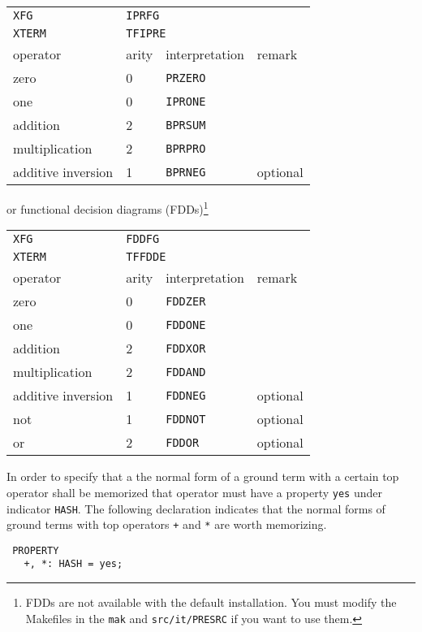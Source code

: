 \begin{description}
\begin{tabular}[t]{l|l|l|l}
\hline
\texttt{XFG} & \multicolumn{3}{l}{\texttt{IPRFG}} \\
\texttt{XTERM} & \multicolumn{3}{l}{\texttt{TFIPRE}} \\
\hline
\hline
operator & arity & interpretation & remark \\
\hline
zero & 0 & \texttt{PRZERO} \\
one & 0 & \texttt{IPRONE} \\
addition & 2 & \texttt{BPRSUM} \\
multiplication & 2 & \texttt{BPRPRO} \\
additive inversion & 1 & \texttt{BPRNEG} & optional\\
\hline
\end{tabular}

or functional decision diagrams (FDDs)\footnote{FDDs are not available
with the default installation. You must modify the Makefiles in the
\texttt{mak} and \texttt{src/it/PRESRC} if you want to use them.}

\begin{tabular}[t]{l|l|l|l}
\hline
\texttt{XFG} & \multicolumn{3}{l}{\texttt{FDDFG}} \\
\texttt{XTERM} & \multicolumn{3}{l}{\texttt{TFFDDE}} \\
\hline
\hline
operator & arity & interpretation & remark \\
\hline
zero & 0 & \texttt{FDDZER} \\
one & 0 & \texttt{FDDONE} \\
addition & 2 & \texttt{FDDXOR} \\
multiplication & 2 & \texttt{FDDAND} \\
additive inversion & 1 & \texttt{FDDNEG} & optional\\
not & 1 & \texttt{FDDNOT} & optional \\
or & 2 & \texttt{FDDOR} & optional \\
\hline
\end{tabular}
\end{description}

In order to specify that a the normal form of a ground term with a certain
top operator shall be memorized that operator must have a property 
\texttt{yes} under indicator \texttt{HASH}.
The following declaration indicates that the normal forms of ground terms 
with top operators \texttt{+} and \texttt{*} are worth memorizing.
\begin{verbatim}
 PROPERTY
   +, *: HASH = yes;
\end{verbatim}

